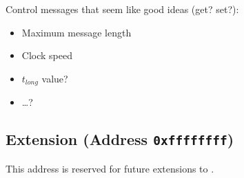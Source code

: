 Control messages that seem like good ideas (get? set?):
\begin{itemize}
  \item Maximum message length
  \item Clock speed
  \item $t_{long}$ value?
  \item \ldots?
\end{itemize}

\subsection{Extension (Address \texttt{0xffffffff})}
This address is reserved for future extensions to \bus.

